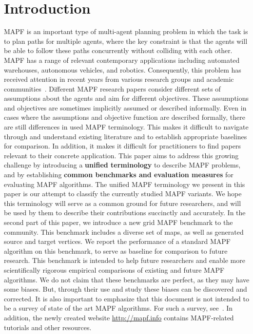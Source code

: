 \documentclass[letterpaper]{article} %
\newcommand{\mapf}{\ac{MAPF}\xspace}
\begin{document}
\section{Introduction}
\mapf is an important type of multi-agent planning problem in which the task is to plan paths for multiple agents,
where the key constraint is that the agents will be able to follow these paths concurrently without colliding with each other. \mapf has a range of relevant contemporary applications including automated warehouses, autonomous vehicles, and robotics. Consequently, this problem has received attention in recent years from various research groups and academic communities~\cite{standley2010finding,felner2017search,surynek2016empirical,bartak2018aScheduling,cohen2018anytime,li2019multi,MaAAAI19a}.
Different \mapf research papers consider different sets of assumptions about the agents and aim for different objectives. These assumptions and objectives are sometimes implicitly assumed or described informally. Even in cases where the assumptions and objective function are described formally, there are still differences in used \mapf terminology. This makes it difficult to navigate through and understand existing literature and to establish appropriate baselines for comparison. In addition, it makes it difficult for practitioners to find papers relevant to their concrete application.
This paper aims to address this growing challenge by introducing  a \textbf{unified terminology} to describe \mapf problems, and by establishing \textbf{common benchmarks and evaluation measures} for evaluating \mapf algorithms.
The unified \mapf terminology we present in this paper is our attempt to classify the currently studied  \mapf variants. We hope this terminology will serve as a common ground for future researchers, and will be used by them to describe their contributions succinctly and accurately. %
In the second part of this paper, we introduce a new grid \mapf benchmark to the community. This benchmark includes a diverse set of maps, as well as generated source and target vertices. We report the performance of a standard \mapf algorithm on this benchmark, to serve as baseline for comparison to future research. This benchmark is intended to help future researchers and enable more scientifically rigorous empirical comparisons of existing and future \mapf algorithms. We do not claim that these benchmarks are perfect, as they may have some biases. But, through their use and study these biases can be discovered and corrected. It is also important to emphasize that this document is not intended to be a survey of  state of the art MAPF algorithms. For such a survey, see~\cite{felner2017search,ma2017buzz}.
In addition, the newly created website
\url{http://mapf.info} contains \mapf-related tutorials and other resources.
\end{document}
